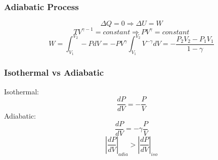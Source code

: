 \documentclass{article}
\begin{document}
\subsubsection*{Adiabatic Process}
\[\Delta Q=0 \Rightarrow \Delta U=W\]
\[TV^{\gamma -1}=constant \Rightarrow PV^\gamma=constant\]
\[W=\int_{V_1}^{V_2}-PdV=-PV^\gamma\int_{V_1}^{V_2}V^{-\gamma}dV=-\frac{P_2V_2-P_1V_1}{1-\gamma}\]

\subsubsection*{Isothermal vs Adiabatic}
Isothermal:
\[\frac{dP}{dV}=-\frac{P}{V}\]
Adiabatic:
\[\frac{dP}{dV}=-\gamma\frac{P}{V}\]
\[\left|{\frac{dP}{dV}}\right|_{adia}>\left|{\frac{dP}{dV}}\right|_{iso}\]
\end{document}
